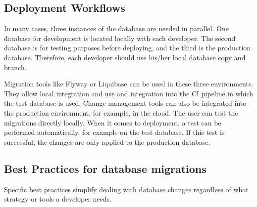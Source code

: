 \subsection{Deployment Workflows}
%
In many cases, three instances of the database are needed in parallel. One database for development is located locally with each developer. The second database is for testing purposes before deploying, and the third is the production database. Therefore, each developer should use his/her local database copy and branch.

Migration tools like Flyway or Liquibase can be used in these three environments. They allow local integration and use and integration into the CI pipeline in which the test database is used. Change management tools can also be integrated into the production environment, for example, in the cloud. The user can test the migrations directly locally. When it comes to deployment, a test can be performed automatically, for example on the test database. If this test is successful, the changes are only applied to the production database.

\subsection{Best Practices for database migrations \label{best_practices}}%
%
Specific best practices simplify dealing with database changes regardless of what strategy or tools a developer needs.

